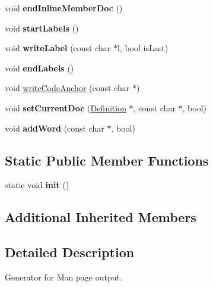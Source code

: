 \begin{DoxyCompactItemize}
\mbox{\label{class_man_generator_ac6140ac8dcdd0c2e53b8e4002c56e2eb}} 
void {\bfseries end\+Inline\+Member\+Doc} ()
\item 
\mbox{\label{class_man_generator_aeee5f7cf35dd6749a0bbd65b5bfe6c0e}} 
void {\bfseries start\+Labels} ()
\item 
\mbox{\label{class_man_generator_aa736a1bd30e274a211288af68c7fa900}} 
void {\bfseries write\+Label} (const char $\ast$l, bool is\+Last)
\item 
\mbox{\label{class_man_generator_ad66fe9b4b75de372b5bd1669d554c5ee}} 
void {\bfseries end\+Labels} ()
\item 
void \mbox{\hyperlink{class_man_generator_a15b2642afa851662afe60fb00d4b20fb}{write\+Code\+Anchor}} (const char $\ast$)
\item 
\mbox{\label{class_man_generator_a2b9d9b85061921cbb368b96e152bc918}} 
void {\bfseries set\+Current\+Doc} (\mbox{\hyperlink{class_definition}{Definition}} $\ast$, const char $\ast$, bool)
\item 
\mbox{\label{class_man_generator_af92adee00e581b1275adef04effe1699}} 
void {\bfseries add\+Word} (const char $\ast$, bool)
\end{DoxyCompactItemize}
\subsection*{Static Public Member Functions}
\begin{DoxyCompactItemize}
\item 
\mbox{\label{class_man_generator_ac85a1b3f99ceba03bd7be38caa0b7600}} 
static void {\bfseries init} ()
\end{DoxyCompactItemize}
\subsection*{Additional Inherited Members}


\subsection{Detailed Description}
Generator for Man page output. 

